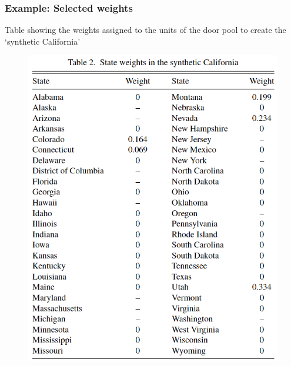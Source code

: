 \documentclass[12pt,english,dvipsnames,aspectratio=169,handout]{beamer}\usepackage[]{graphicx}\usepackage[]{xcolor}
\begin{document}
\begin{frame}
  \frametitle{Example: Selected weights}
\footnotesize

Table showing the weights assigned to the units of the door pool to create the `synthetic California'

	 \begin{figure} 
    \includegraphics[height=.65\textheight,keepaspectratio=true]{../04-figures/08/07-abadietable2}
    \end{figure}
 
\end{frame}
\end{document}
